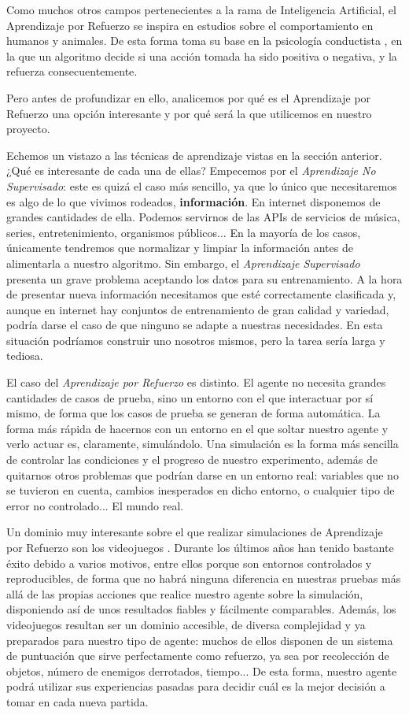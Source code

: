 Como muchos otros campos pertenecientes a la rama de Inteligencia Artificial, el Aprendizaje por Refuerzo \citep{Watkins1992} se inspira en estudios sobre el comportamiento en humanos y animales. De esta forma toma su base en la psicología conductista \citet{Skinner1953}, en la que un algoritmo decide si una acción tomada ha sido positiva o negativa, y la refuerza consecuentemente.

Pero antes de profundizar en ello, analicemos por qué es el Aprendizaje por Refuerzo una opción interesante y por qué será la que utilicemos en nuestro proyecto.

Echemos un vistazo a las técnicas de aprendizaje vistas en la sección anterior. ¿Qué es interesante de cada una de ellas? Empecemos por el \textit{Aprendizaje No Supervisado}: este es quizá el caso más sencillo, ya que lo único que necesitaremos es algo de lo que vivimos rodeados, \textbf{información}. En internet disponemos de grandes cantidades de ella. Podemos servirnos de las APIs de servicios de música, series, entretenimiento, organismos públicos... En la mayoría de los casos, únicamente tendremos que normalizar y limpiar la información antes de alimentarla a nuestro algoritmo. Sin embargo, el \textit{Aprendizaje Supervisado} presenta un grave problema aceptando los datos para su entrenamiento. A la hora de presentar nueva información necesitamos que esté correctamente clasificada y, aunque en internet hay conjuntos de entrenamiento de gran calidad y variedad, podría darse el caso de que ninguno se adapte a nuestras necesidades. En esta situación podríamos construir uno nosotros mismos, pero la tarea sería larga y tediosa.

El caso del \textit{Aprendizaje por Refuerzo} es distinto. El agente no necesita grandes cantidades de casos de prueba, sino un entorno con el que interactuar por sí mismo, de forma que los casos de prueba se generan de forma automática. La forma más rápida de hacernos con un entorno en el que soltar nuestro agente y verlo actuar es, claramente, simulándolo. Una simulación es la forma más sencilla de controlar las condiciones y el progreso de nuestro experimento, además de quitarnos otros problemas que podrían darse en un entorno real: variables que no se tuvieron en cuenta, cambios inesperados en dicho entorno, o cualquier tipo de error no controlado... El mundo real.

Un dominio muy interesante sobre el que realizar simulaciones de Aprendizaje por Refuerzo son los videojuegos \citep{Rodriguez2018}. Durante los últimos años han tenido bastante éxito debido a varios motivos, entre ellos porque son entornos controlados y reproducibles, de forma que no habrá ninguna diferencia en nuestras pruebas más allá de las propias acciones que realice nuestro agente sobre la simulación, disponiendo así de unos resultados fiables y fácilmente comparables. Además, los videojuegos resultan ser un dominio accesible, de diversa complejidad y ya preparados para nuestro tipo de agente: muchos de ellos disponen de un sistema de puntuación que sirve perfectamente como refuerzo, ya sea por recolección de objetos, número de enemigos derrotados, tiempo... De esta forma, nuestro agente podrá utilizar sus experiencias pasadas para decidir cuál es la mejor decisión a tomar en cada nueva partida.

